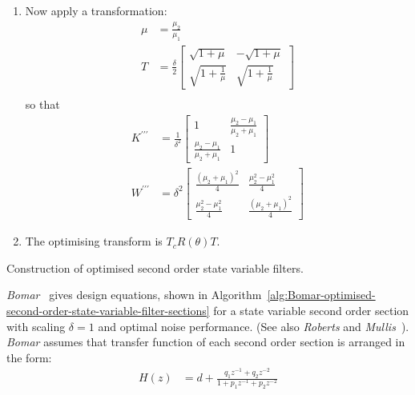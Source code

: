 \documentclass[a4paper,twoside,10pt,english]{report}
\begin{document}
\begin{algorithm}[!htpb]
\begin{enumerate}
\item Now apply a transformation:
\begin{align*}
\mu & =  \frac{\mu_{2}}{\mu_{1}}\\
T & =  \frac{\delta}{2}\left[\begin{array}{cc}
\sqrt{1+\mu} & -\sqrt{1+\mu}\\
\sqrt{1+\frac{1}{\mu}} & \sqrt{1+\frac{1}{\mu}}
\end{array}\right]\\
\end{align*}
 so that
\begin{align*}
K^{\prime\prime\prime} & = \frac{1}{\delta^{2}}\left[\begin{array}{cc}
1 & \frac{\mu_{2}-\mu_{1}}{\mu_{2}+\mu_{1}}\\
\frac{\mu_{2}-\mu_{1}}{\mu_{2}+\mu_{1}} & 1
\end{array}\right]\\
W^{\prime\prime\prime} & = \delta^{2}\left[\begin{array}{cc}
\frac{\left(\mu_{2}+\mu_{1}\right)^{2}}{4} & \frac{\mu_{2}^{2}-\mu_{1}^{2}}{4}\\
\frac{\mu_{2}^{2}-\mu_{1}^{2}}{4} & \frac{\left(\mu_{2}+\mu_{1}\right)^{2}}{4}
\end{array}\right]
\end{align*}
\item The optimising transform is $T_{c}R\left(\theta\right)T$.
\end{enumerate}
\caption{Construction of optimised second order state variable filters\cite[Figure 9.14.1]{RobertsMullis_DigitalSignalProcessing}.}
\label{alg:Construction-optimised-second-order-state-variable-filters}
\end{algorithm}

\emph{Bomar}~\cite{Bomar_NewSecondOrderStateSpaceStructures} gives design 
equations, shown in 
Algorithm~\ref{alg:Bomar-optimised-second-order-state-variable-filter-sections}
for a state variable second order section with scaling $\delta=1$ and optimal
noise performance. (See also \emph{Roberts} and
\emph{Mullis}~\cite[Figure 9.12.1 with corrections]{RobertsMullis_DigitalSignalProcessing}).
\emph{Bomar} assumes that transfer function of each second order section is 
arranged in the form:
\begin{align}
H\left(z\right) &= d + \frac{q_{1}z^{-1}+q_{2}z^{-2}}{1+p_{1}z^{-1}+p_{2}z^{-2}}
\label{eqn:Second-order-section-transfer-function}
\end{align}
\end{document}
